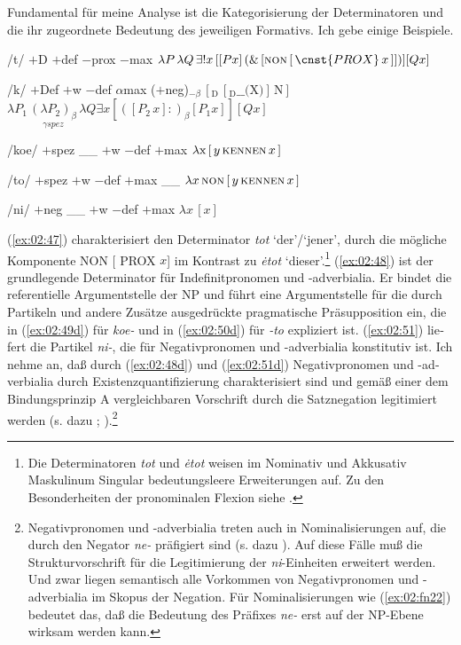 \documentclass[output=paper, colorlinks, citecolor=brown, booklanguage=german]{langscibook}
\begin{document}
\begin{otherlanguage}{german}
\noindent Fundamental für meine Analyse ist die Kategorisierung der Determinatoren und die ihr zugeordnete Bedeutung des jeweiligen Formativs. Ich gebe einige Beispiele.

\ea\label{ex:02:47}
    \ea /t/
    \ex $+$D $+$def $-$prox $-$max
    \ex $\lambda P\, \lambda Q\, \exists! x\, [[ P x ]\, (\&\, [ \textsc{non}\, [\,\cnst{PROX}\, x\,]]) ][Q x]$
\z\z 

\ea\label{ex:02:48}
    \ea /k/
    \ex $+$Def $+$w $-$def $\alpha$max 
    \ex ($+$neg)$_{-\beta}\, [_\textrm{D}\, [_\textrm{D} \_\_ \textrm{(X)} ]\, \textrm{N} ]$
    \ex\label{ex:02:48d} $\lambda P_1\, \underset{\gamma spez}{(\lambda P_2)_\beta}\, \lambda Q \exists x [([P_2 \, x] :)_\beta [P_1 x]][Q x]$
\z\z 

\ea\label{ex:02:49}
    \ea /koe/
    \ex $+$spez
    \ex \_\_ $+$w $-$def $+$max
    \ex\label{ex:02:49d} $\lambda \textrm{x}\, [\,y\, \textsc{kennen}\, x\,]$
\z\z 

\ea\label{ex:02:50}
    \ea /to/
    \ex $+$spez
    \ex $+$w $-$def $+$max \_\_
    \ex\label{ex:02:50d} $\lambda x\, \textsc{non}\, [\,y\, \textsc{kennen}\, x\,]$
\z\z 

\ea\label{ex:02:51}
    \ea /ni/
    \ex $+$neg
    \ex \_\_ $+$w $-$def $+$max
    \ex\label{ex:02:51d} $\lambda x\, [x]$
\z\z 

\noindent (\ref{ex:02:47}) charakterisiert den Determinator \textit{tot} `der'/`jener', durch die mögliche Komponente NON [ PROX $x$] im Kontrast zu \textit{\.{e}tot} `dieser'.\footnote{Die Determinatoren \textit{tot} und \textit{\.{e}tot} weisen im Nominativ und Akkusativ Maskulinum Singular bedeutungsleere Erweiterungen auf. Zu den Besonderheiten der pronominalen Flexion siehe \citet{Zaliznja1977}.} (\ref{ex:02:48}) ist der grundlegende Determinator für Indefinitpronomen und -adverbialia. Er bindet die referentielle Argumentstelle der NP und führt eine Argumentstelle für die durch Partikeln und andere Zusätze ausgedrückte pragmatische Präsupposition ein, die in (\ref{ex:02:49d}) für \textit{koe-} und in (\ref{ex:02:50d}) für \textit{-to} expliziert ist. (\ref{ex:02:51}) liefert die Partikel \textit{ni-}, die für Negativpronomen und -adverbialia konstitutiv ist. Ich nehme an, daß durch (\ref{ex:02:48d}) und (\ref{ex:02:51d}) Negativpronomen und -adverbialia durch Existenzquantifizierung charakterisiert sind und gemäß einer dem Bindungsprinzip A vergleichbaren Vorschrift durch die Satznegation legitimiert werden (s. dazu \citealt{Progovac1994}; \citealt[Kap. 4]{Blaszczak1998,Blaszczak2000}).\footnote{Negativpronomen und -ad\-verbialia treten auch in Nomi\-na\-li\-sierungen auf, die durch den Negator \textit{ne-} präfigiert sind (s. dazu \citealt{Zimmermann1988}). Auf diese Fälle muß die Strukturvorschrift für die Legitimierung der \textit{ni}-Einheiten erweitert werden. Und zwar liegen semantisch alle Vorkommen von Negativpronomen und -ad\-ver\-bialia im Skopus der Negation. Für Nomi\-na\-li\-sierungen wie (\ref{ex:02:fn22}) bedeutet das, daß die Bedeutung des Präfixes \textit{ne-} erst auf der NP-Ebene wirksam werden kann.

}
\end{otherlanguage}
\end{document}
